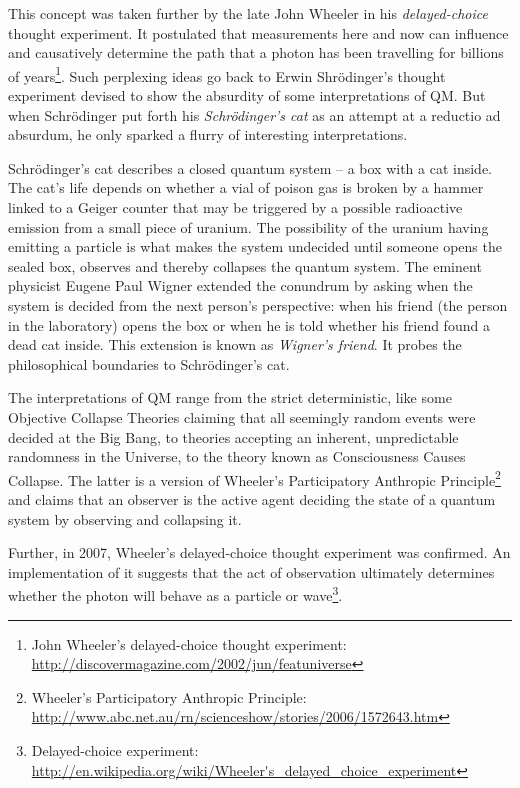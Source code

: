 \documentclass[11pt]{article}
\begin{document}
This concept was taken further by the late John Wheeler in his {\em
delayed-choice} thought experiment. It postulated that measurements here and now
can influence and causatively determine the path that a photon has been
travelling for billions of years\footnote{ John Wheeler's delayed-choice thought
experiment: \url{http://discovermagazine.com/2002/jun/featuniverse}}. Such
perplexing ideas go back to Erwin Shr\"{o}dinger's thought experiment devised to
show the absurdity of some interpretations of QM. But when Schr\"{o}dinger put
forth his {\em Schr\"{o}dinger's cat} as an attempt at a reductio ad absurdum,
he only sparked a flurry of interesting interpretations.

Schr\"{o}dinger's cat describes a closed quantum system -- a box with a cat
inside.  The cat's life depends on whether a vial of poison gas is broken by a
hammer linked to a Geiger counter that may be triggered by a possible
radioactive emission from a small piece of uranium. The possibility of the
uranium having emitting a particle is what makes the system undecided until
someone opens the sealed box, observes and thereby collapses the quantum system.
The eminent physicist Eugene Paul Wigner extended the conundrum by asking when
the system is decided from the next person's perspective: when his friend (the
person in the laboratory) opens the box or when he is told whether his friend
found a dead cat inside. This extension is known as {\em Wigner's friend}. It
probes the philosophical boundaries to Schr\"{o}dinger's cat.

The interpretations of QM range from the strict deterministic, like some
Objective Collapse Theories claiming that all seemingly random events were
decided at the Big Bang, to theories accepting an inherent, unpredictable
randomness in the Universe, to the theory known as Consciousness Causes
Collapse. The latter is a version of Wheeler's Participatory Anthropic
Principle\footnote{ Wheeler's Participatory Anthropic Principle:
\url{http://www.abc.net.au/rn/scienceshow/stories/2006/1572643.htm}} and claims
that an observer is the active agent deciding the state of a quantum system by
observing and collapsing it. 

Further, in 2007, Wheeler's delayed-choice thought experiment was confirmed.  An
implementation of it suggests that the act of observation ultimately determines
whether the photon will behave as a particle or wave\footnote{ Delayed-choice
experiment:
\url{http://en.wikipedia.org/wiki/Wheeler's\_delayed\_choice\_experiment}}.
\end{document}
